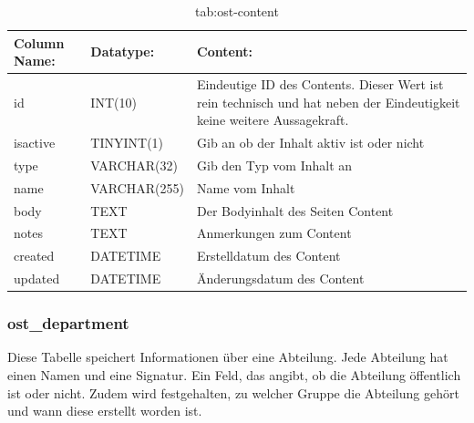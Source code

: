 \begin{table}[h]
	\begin{tabular}{|p{3.5cm}|p{4cm}|p{6.2cm}|}
		\hline
		\textbf{Column Name:} & \textbf{Datatype:} & \textbf{Content:}\\
		\hline
		id & INT(10) & Eindeutige ID des Contents. Dieser Wert ist rein technisch und hat  neben der Eindeutigkeit keine weitere 
		Aussagekraft.\\
		\hline
		isactive & TINYINT(1) & Gib an ob der Inhalt aktiv ist oder nicht\\
		\hline
		type & VARCHAR(32) & Gib den Typ vom Inhalt an\\
		\hline
		name & VARCHAR(255) & Name vom Inhalt\\
		\hline
		body & TEXT & Der Bodyinhalt des Seiten Content\\
		\hline
		notes & TEXT & Anmerkungen zum Content\\
		\hline
		created & DATETIME & Erstelldatum des Content\\
		\hline
		updated & DATETIME & Änderungsdatum des Content\\
		\hline
	\end{tabular}
	\caption{tab:ost-content}
\end{table}
\label{tab:ost_content}

\newpage

\subsubsection{ost\_department}

Diese Tabelle speichert Informationen über eine Abteilung. Jede Abteilung hat einen Namen und eine Signatur. Ein Feld, das angibt, ob die Abteilung öffentlich ist oder nicht. Zudem wird festgehalten, zu welcher Gruppe die Abteilung gehört und wann diese erstellt worden ist.

